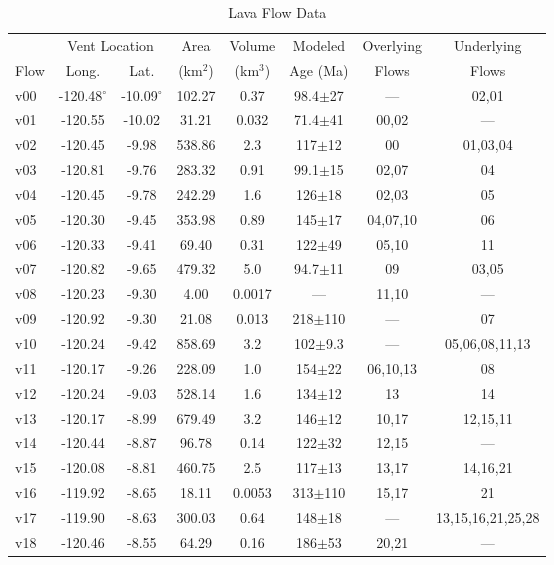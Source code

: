 \documentclass[12pt,letter]{article}
\begin{document}
	\begin{center}
		\begin{table}[h]
		\caption{Lava Flow Data}
		\begin{tabular}{l c c c c c c c}
			\toprule
				 & \multicolumn{2}{c}{Vent Location}  & Area & Volume & Modeled & Overlying & Underlying\\
				Flow & Long. & Lat. & (km$^2$) & (km$^3$) & Age (Ma) & Flows & Flows\\
			\midrule
				v00 & -120.48$^{\circ}$ & -10.09$^{\circ}$ & 102.27 & 0.37 & 98.4$\pm$27 & --- & 02,01\\
				v01 & -120.55 & -10.02 & 31.21 & 0.032 & 71.4$\pm$41 & 00,02 & ---\\
				v02 & -120.45 & -9.98 & 538.86 & 2.3 & 117$\pm$12 & 00 & 01,03,04\\
				v03 & -120.81 & -9.76 & 283.32 & 0.91 & 99.1$\pm$15 & 02,07 & 04\\
				v04 & -120.45 & -9.78 & 242.29 & 1.6 & 126$\pm$18 & 02,03 & 05\\
				v05 & -120.30 & -9.45 & 353.98 & 0.89 & 145$\pm$17 & 04,07,10 & 06\\
				v06 & -120.33 & -9.41 & 69.40 & 0.31 & 122$\pm$49 & 05,10 & 11\\
				v07 & -120.82 & -9.65 & 479.32 & 5.0 & 94.7$\pm$11 & 09 & 03,05\\
				v08 & -120.23 & -9.30 & 4.00 & 0.0017 & --- & 11,10 & ---\\
				v09 & -120.92 & -9.30 & 21.08 & 0.013 & 218$\pm$110 & --- & 07\\
				v10 & -120.24 & -9.42 & 858.69 & 3.2 & 102$\pm$9.3 & --- & 05,06,08,11,13\\
				v11 & -120.17 & -9.26 & 228.09 & 1.0 & 154$\pm$22 & 06,10,13 & 08\\
				v12 & -120.24 & -9.03 & 528.14 & 1.6 & 134$\pm$12 & 13 & 14\\
				v13 & -120.17 & -8.99 & 679.49 & 3.2 & 146$\pm$12 & 10,17 & 12,15,11\\
				v14 & -120.44 & -8.87 & 96.78 & 0.14 & 122$\pm$32 & 12,15 & ---\\
				v15 & -120.08 & -8.81 & 460.75 & 2.5 & 117$\pm$13 & 13,17 & 14,16,21\\
				v16 & -119.92 & -8.65 & 18.11 & 0.0053 & 313$\pm$110 & 15,17 & 21\\
				v17 & -119.90 & -8.63 & 300.03 & 0.64 & 148$\pm$18 & --- & 13,15,16,21,25,28\\
				v18 & -120.46 & -8.55 & 64.29 & 0.16 & 186$\pm$53 & 20,21 & ---\\

\end{tabular}
\end{table}
\end{center}
\end{document}
